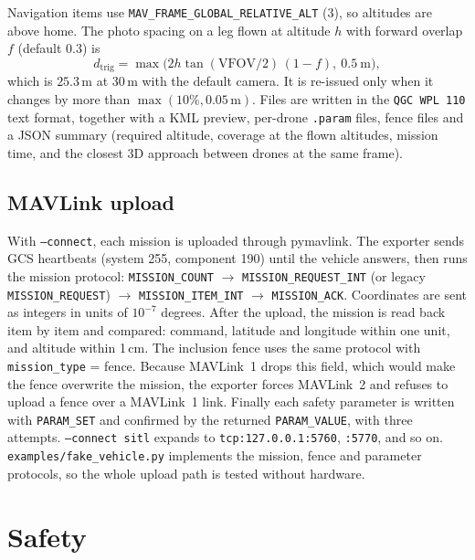 \documentclass[11pt,a4paper]{article}
\newcommand{\code}[1]{\texttt{#1}}
\newcommand{\VFOV}{\mathrm{VFOV}}
\begin{document}
Navigation items use \code{MAV\_FRAME\_GLOBAL\_RELATIVE\_ALT} (3), so altitudes are above home. The photo
spacing on a leg flown at altitude $h$ with forward overlap $f$ (default $0.3$) is
\begin{equation}
d_{\text{trig}} = \max\bigl(2h\tan(\VFOV/2)\,(1-f),\ 0.5\ \text{m}\bigr),
\label{eq:trig}
\end{equation}
which is $25.3$\,m at 30\,m with the default camera. It is re-issued only when it changes by more than
$\max(10\%, 0.05\,\text{m})$. Files are written in the \code{QGC WPL 110} text format, together with a KML
preview, per-drone \code{.param} files, fence files and a JSON summary (required altitude, coverage at the
flown altitudes, mission time, and the closest 3D approach between drones at the same frame).

\subsection{MAVLink upload}

With \code{--connect}, each mission is uploaded through pymavlink. The exporter sends GCS heartbeats
(system 255, component 190) until the vehicle answers, then runs the mission protocol:
\code{MISSION\_COUNT} $\to$ \code{MISSION\_REQUEST\_INT} (or legacy \code{MISSION\_REQUEST}) $\to$
\code{MISSION\_ITEM\_INT} $\to$ \code{MISSION\_ACK}. Coordinates are sent as integers in units of
$10^{-7}$ degrees. After the upload, the mission is read back item by item and compared: command, latitude
and longitude within one unit, and altitude within 1\,cm. The inclusion fence uses the same protocol with
\code{mission\_type} = fence. Because MAVLink~1 drops this field, which would make the fence overwrite the
mission, the exporter forces MAVLink~2 and refuses to upload a fence over a MAVLink~1 link. Finally each
safety parameter is written with \code{PARAM\_SET} and confirmed by the returned \code{PARAM\_VALUE}, with
three attempts. \code{--connect sitl} expands to \code{tcp:127.0.0.1:5760}, \code{:5770}, and so on.
\code{examples/fake\_vehicle.py} implements the mission, fence and parameter protocols, so the whole upload
path is tested without hardware.

\section{Safety}
\label{sec:safety}
\end{document}
